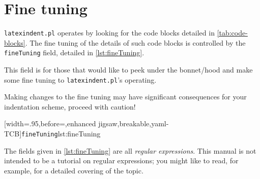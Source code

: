 \section{Fine tuning}\label{sec:finetuning}
 \texttt{latexindent.pl} operates by looking for the code blocks detailed in
 \vref{tab:code-blocks}.
  The fine tuning of the
 details of such code blocks is controlled by the \texttt{fineTuning} field, detailed in
 \cref{lst:fineTuning}.

 This field is for those that would like to peek under the bonnet/hood and make some fine
 tuning to \texttt{latexindent.pl}'s operating.         
      

 \begin{warning}
  Making changes to the fine tuning may have significant consequences for your indentation
  scheme, proceed with caution!
 \end{warning}

 \begin{widepage}
  [width=.95\linewidth,before=\centering,enhanced jigsaw,breakable,yaml-TCB]{\texttt{fineTuning}}{lst:fineTuning}
 \end{widepage}

 The fields given in \cref{lst:fineTuning} are all \emph{regular expressions}. This manual
 is not intended to be a tutorial on regular expressions; you might like to read, for
 example, \cite{masteringregexp} for a detailed covering of the topic.

